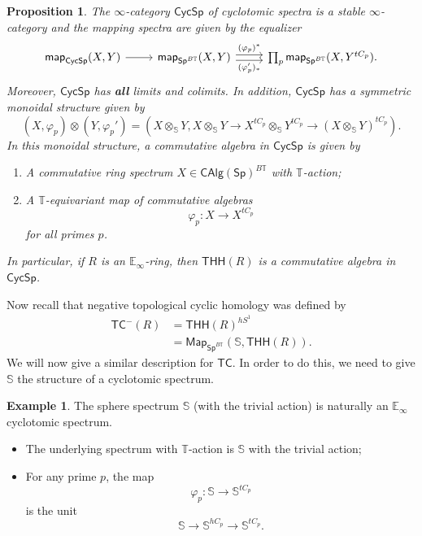 \documentclass[10pt, oneside]{memoir}
\newtheorem{prop}[thm]{Proposition}
\theoremstyle{definition}
\newtheorem{exm}[thm]{Example}
\theoremstyle{remark}
\theoremstyle{plain}
\theoremstyle{definition}
\theoremstyle{remark}
\newcommand{\E}{\mathbb{E}}
\newcommand{\bS}{\mathbb{S}}
\newcommand{\T}{\mathbb{T}}
\newcommand{\ms}[1]{\mathsf{#1}}
\newcommand{\1}{\mathbf{1}}
\newcommand{\2}{\mathbf{2}}
\newcommand{\3}{\mathbf{3}}
\newcommand{\THH}{\ms{THH}}
\newcommand{\TC}{\ms{TC}}
\begin{document}
\begin{prop}
    The $\infty$-category $\ms{CycSp}$ of cyclotomic spectra is a stable $\infty$-category and the mapping spectra are given by the equalizer
    \begin{equation*}
        \begin{tikzcd}
            \ms{map}_{\ms{CycSp}}(X, Y) \ar{r} & \ms{map}_{\ms{Sp}^{B\T}}(X,Y) \ar[shift left=1]{r}{(\varphi_p)^*} \ar[shift right=1]{r}[swap]{(\varphi_p')_*} & \prod_p \ms{map}_{\ms{Sp}^{B\T}}(X, Y^{tC_p}).
        \end{tikzcd}
    \end{equation*}
    Moreover, $\ms{CycSp}$ has \textbf{all} limits and colimits. In addition, $\ms{CycSp}$ has a symmetric monoidal structure given by
    \[ (X, \varphi_p) \otimes (Y, \varphi_p') = (X \otimes_{\bS} Y, X \otimes_{\bS} Y \to X^{tC_p} \otimes_{\bS} Y^{tC_p} \to (X \otimes_{\bS} Y)^{tC_p}). \]
    In this monoidal structure, a commutative algebra in $\ms{CycSp}$ is given by
    \begin{enumerate}
        \item A commutative ring spectrum $X \in \ms{CAlg}(\ms{Sp})^{B\T}$ with $\T$-action;
        \item A $\T$-equivariant map of commutative algebras
        \[ \varphi_p \colon X \to X^{tC_p} \]
        for all primes $p$.
    \end{enumerate}
    In particular, if $R$ is an $\E_{\infty}$-ring, then $\THH(R)$ is a commutative algebra in $\ms{CycSp}$.
\end{prop}

Now recall that negative topological cyclic homology was defined by
\begin{align*}
    \ms{TC}^-(R) &= \THH(R)^{hS^1} \\
    &= \ms{Map}_{\ms{Sp}^{B\T}}(\bS, \THH(R)).
\end{align*}
We will now give a similar description for $\TC$. In order to do this, we need to give $\bS$ the structure of a cyclotomic spectrum.

\begin{exm}
    The sphere spectrum $\bS$ (with the trivial action) is naturally an $\E_{\infty}$ cyclotomic spectrum.
    \begin{itemize}
        \item The underlying spectrum with $\T$-action is $\bS$ with the trivial action;
        \item For any prime $p$, the map
        \[ \varphi_p \colon \bS \to \bS^{tC_p} \]
        is the unit
        \[ \bS \to \bS^{hC_p} \to \bS^{tC_p}. \]
    \end{itemize}
\end{exm}
\end{document}
